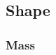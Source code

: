 \documentclass{beamer}
\begin{document}
\subsection{Shape}
\begin{frame}\frametitle{Mass}
    \begin{columns}
    \begin{column}{0.6\textwidth}
	\begin{figure}

\end{figure}
\end{column}
\end{columns}
\end{frame}
\end{document}
